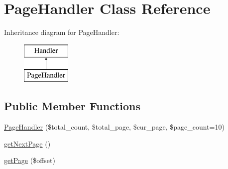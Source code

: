 \hypertarget{classPageHandler}{\section{Page\+Handler Class Reference}
\label{classPageHandler}
}
Inheritance diagram for Page\+Handler\+:\begin{figure}[H]
\begin{center}
\leavevmode
\includegraphics[height=2.000000cm]{classPageHandler}
\end{center}
\end{figure}
\subsection*{Public Member Functions}
\begin{DoxyCompactItemize}
\item 
\hyperlink{classPageHandler_a98c8fc6b290d49c3880c323b263fe7e7}{Page\+Handler} (\$total\+\_\+count, \$total\+\_\+page, \$cur\+\_\+page, \$page\+\_\+count=10)
\item 
\hyperlink{classPageHandler_a259d01838d005d854d4cc263ba524de7}{get\+Next\+Page} ()
\item 
\hyperlink{classPageHandler_a971f178609a0dd6e1a0fd07daa94782d}{get\+Page} (\$offset)
\end{DoxyCompactItemize}
